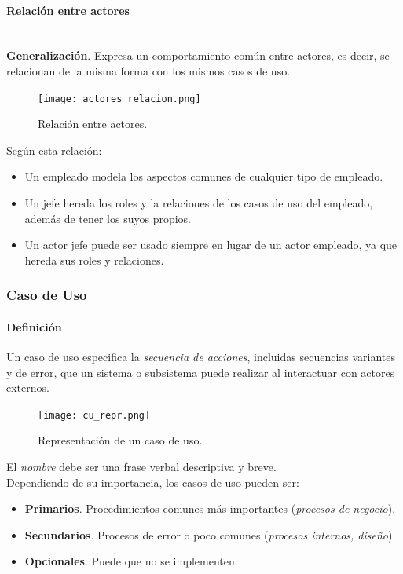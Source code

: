 \documentclass[12pt,spanish]{article}
\begin{document}
\newpage

\paragraph{Relación entre actores\\\\}

\textbf{Generalización}. Expresa un comportamiento común entre actores, es decir, se relacionan de la misma forma con los mismos casos de uso.

\begin{figure}[H]
	\centering
	\texttt{[image: actores\_relacion.png]}
	\caption{Relación entre actores.}
\end{figure}

Según esta relación:
\begin{itemize}
	\item Un empleado modela los aspectos comunes de cualquier tipo de empleado.
	\item Un jefe hereda los roles y la relaciones de los casos de uso del empleado, además de tener los suyos propios.
	\item Un actor jefe puede ser usado siempre en lugar de un actor empleado, ya que hereda sus roles y relaciones.
\end{itemize}


\subsubsection{Caso de Uso}

\paragraph{Definición}

Un caso de uso especifica la \emph{secuencia de acciones}, incluidas secuencias variantes y de error, que un sistema o subsistema puede realizar al interactuar con actores externos.

\begin{figure}[H]
	\centering
	\texttt{[image: cu\_repr.png]}
	\caption{Representación de un caso de uso.}
\end{figure}

El \emph{nombre} debe ser una frase verbal descriptiva y breve.\\
Dependiendo de su importancia, los casos de uso pueden ser:
\begin{itemize}
	\item \textbf{Primarios}. Procedimientos comunes más importantes (\emph{procesos de negocio}).
	\item \textbf{Secundarios}. Procesos de error o poco comunes (\emph{procesos internos, diseño}).
	\item \textbf{Opcionales}. Puede que no se implementen.
\end{itemize}
\end{document}
